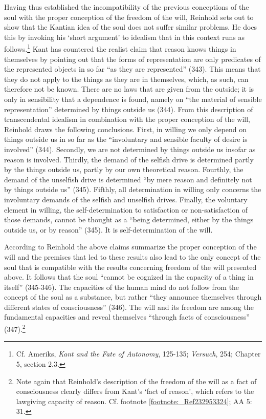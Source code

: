  Having thus established the incompatibility of the previous conceptions of the soul with the proper conception of the freedom of the will, Reinhold sets out to show that the Kantian idea of the soul does not suffer similar problems. He does this by invoking his `short argument' to idealism that in this context runs as follows.\footnote{ Cf. Ameriks, \textit{Kant and the Fate of Autonomy}, 125{-}135; \textit{Versuch}, 254; Chapter 5, section 2.3.} Kant has countered the realist claim that reason knows things in themselves by pointing out that the forms of representation are only predicates of the represented objects in so far ``as they are represented'' (343). This means that they do not apply to the things as they are in themselves, which, as such, can therefore not be known. There are no laws that are given from the outside; it is only in sensibility that a dependence is found, namely on ``the material of sensible representation'' determined by things outside us (344). From this description of transcendental idealism in combination with the proper conception of the will, Reinhold draws the following conclusions. First, in willing we only depend on things outside us in so far as the ``involuntary and sensible faculty of desire is involved'' (344). Secondly, we are not determined by things outside us insofar as reason is involved. Thirdly, the demand of the selfish drive is determined partly by the things outside us, partly by our own theoretical reason. Fourthly, the demand of the unselfish drive is determined ``by mere reason and definitely not by things outside us'' (345). Fifthly, all determination in willing only concerns the involuntary demands of the selfish and unselfish drives. Finally, the voluntary element in willing, the self{-}determination to satisfaction or non{-}satisfaction of those demands, cannot be thought as a ``being determined, either by the things outside us, or by reason'' (345). It is self{-}determination of the will.

 According to Reinhold the above claims summarize the proper conception of the will and the premises that led to these results also lead to the only concept of the soul that is compatible with the results concerning freedom of the will presented above. It follows that the soul ``cannot be cognized in the capacity of a thing in itself'' (345{-}346). The capacities of the human mind do not follow from the concept of the soul as a substance, but rather ``they announce themselves through different states of consciousness'' (346). The will and its freedom are among the fundamental capacities and reveal themselves ``through facts of consciousness'' (347).\footnote{ Note again that Reinhold's description of the freedom of the will as a fact of consciousness clearly differs from Kant's `fact of reason', which refers to the lawgiving capacity of reason. Cf. footnote \ref{footnote:_Ref232953324}; AA 5: 31.}

